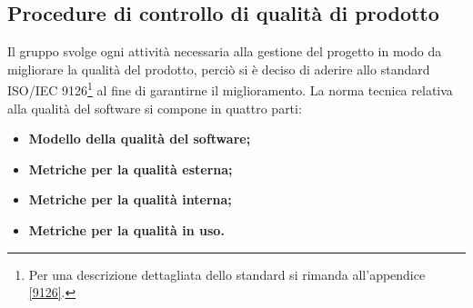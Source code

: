 \subsection{Procedure di controllo di qualità di prodotto}
Il gruppo svolge ogni attività necessaria alla gestione del progetto in modo da migliorare la qualità del prodotto, perciò si è deciso di aderire allo standard ISO/IEC 9126\footnote{Per una descrizione dettagliata dello standard si rimanda all'appendice \ref{9126}.} al fine di garantirne il miglioramento. La norma tecnica relativa alla qualità del software si compone in quattro parti:
\begin{itemize}
	\item \textbf{Modello della qualità del software;}
	\item \textbf{Metriche per la qualità esterna;}
	\item \textbf{Metriche per la qualità interna;}
	\item \textbf{Metriche per la qualità in uso.}
\end{itemize}